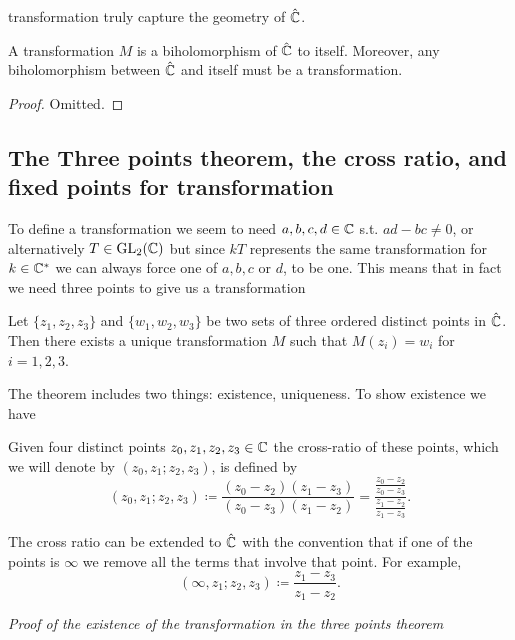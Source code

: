 \documentclass[10pt, a4paper]{article}
\begin{document}
\mobius transformation truly capture the geometry of $\hat{\mathbb{C}}$.

\begin{proposition}
    A \mobius transformation $M$ is a biholomorphism of $\hat{\mathbb{C}}$ to itself.
    Moreover,
    any biholomorphism between $\hat{\mathbb{C}}$ and itself must be a \mobius transformation.

    \begin{proof}
        Omitted.
    \end{proof}
\end{proposition}

\subsection{The Three points theorem,
the cross ratio,
and fixed points for \mobius transformation}

To define a \mobius transformation we seem to need $a, b, c, d \in \mathbb{C}$ s.t. $ad - bc \neq 0$,
or alternatively $T \in \mathrm{GL}_2(\mathbb{C})$ but since $kT$ represents the same \mobius transformation for $k \in \mathbb{C} ^ {*}$ we can always force one of $a, b, c$ or $d$,
to be one.
This means that in fact we need three points to give us a \mobius transformation

\begin{theorem}
    Let $\{z_1, z_2, z_3\}$ and $\{w_1, w_2, w_3\}$ be two sets of three ordered distinct points in $\hat{\mathbb{C}}$.
    Then there exists a unique \mobius transformation $M$ such that $M(z_i) = w_i$ for $i = 1, 2, 3$.
\end{theorem}
The theorem includes two things:
existence,
uniqueness.
To show existence we have
\begin{definition}
    Given four distinct points $z_0, z_1, z_2, z_3 \in \mathbb{C}$ the cross-ratio of these points,
    which we will denote by $(z_0, z_1; z_2, z_3)$,
    is defined by
    \[
    (z_0, z_1; z_2, z_3) \coloneqq \frac{(z_0 - z_2)(z_1 - z_3)}{(z_0 - z_3)(z_1 - z_2)} = \frac{\frac{z_0 - z_2}{z_0 - z_3}}{\frac{z_1 - z_2}{z_1 - z_3}}.
    \]
\end{definition}

The cross ratio can be extended to $\hat{\mathbb{C}}$ with the convention that if one of the points is $\infty$ we remove all the terms that involve that point.
For example,
\[
(\infty, z_1; z_2, z_3) \coloneqq \frac{z_1 - z_3}{z_1 - z_2}.
\]

\textit{Proof of the existence of the \mobius transformation in the three points theorem}
\end{document}
